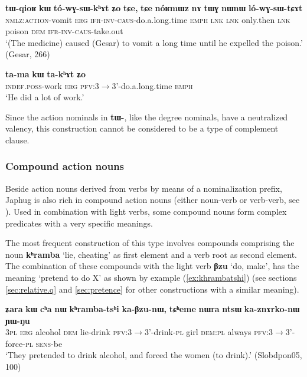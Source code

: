 \documentclass[oneside,a4paper,11pt]{article}
\newcommand{\ipa}[1]{\textbf{\phon#1}} %
\newcommand{\jpg}[2]{\ipa{#1} `#2'} %
\newcommand{\refb}[1]{(\ref{#1})}
\begin{document}
  \begin{exe}
\ex \label{ex:tWqioR}
\gll \ipa{tɯ-qioʁ}	\ipa{kɯ}	\ipa{tó-wɣ-sɯ-kʰɤt}	\ipa{ʑo}	\ipa{tɕe,}	\ipa{tɕe}	\ipa{nóʁmɯz}	\ipa{nɤ}	\ipa{tɯɣ}	\ipa{nɯnɯ}	\ipa{ló-wɣ-sɯ-tɕɤt} \\
\textsc{nmlz:action}-vomit \textsc{erg} \textsc{ifr-inv-caus}-do.a.long.time \textsc{emph} \textsc{lnk} \textsc{lnk} only.then \textsc{lnk} poison \textsc{dem} \textsc{ifr-inv-caus}-take.out \\
\glt `(The medicine) caused (Gesar) to vomit a long time until he expelled the poison.' (Gesar, 266)
\end{exe}

  \begin{exe}
\ex \label{ex:takhAt}
\gll 
\ipa{ta-ma}	\ipa{kɯ}	\ipa{ta-kʰɤt}	\ipa{ʑo} \\
\textsc{indef.poss}-work \textsc{erg} \textsc{pfv}:3$\rightarrow$3'-do.a.long.time \textsc{emph} \\
\glt  `He did a lot of work.'
\end{exe}

Since the action nominals in \ipa{tɯ-}, like the degree nominals, have a neutralized valency, this construction cannot be considered to be a type of complement clause.

\subsubsection{Compound action nouns} \label{sec:compound}
Beside action nouns derived from verbs by means of a nominalization prefix, Japhug is also rich in compound action nouns (either noun-verb or verb-verb, see \citealt{jacques12incorp}). Used in combination with light verbs, some compound nouns form complex predicates with a very specific meanings.

The most frequent construction of this type involves compounds comprising the noun \jpg{kʰramba}{lie, cheating} as first element and a verb root as second element. The combination of these compounds with the light verb \jpg{βzu}{do, make}, has the meaning `pretend to do X' as shown by example \refb{ex:khrambatshi} (see sections \ref{sec:relative.q} and \ref{sec:pretence} for other constructions with a similar meaning).

\begin{exe}
\ex \label{ex:khrambatshi}
 \gll 
\ipa{ʑara} 	\ipa{kɯ} 	\ipa{cʰa} 	\ipa{nɯ} 	\ipa{kʰramba-tsʰi} 	\ipa{ka-βzu-nɯ,} 	\ipa{tɕʰeme} 	\ipa{nɯra} 	\ipa{ntsɯ} 	\ipa{ka-znɤrko-nɯ} 	\ipa{ɲɯ-ŋu}  \\
\textsc{3pl} \textsc{erg} alcohol \textsc{dem} lie-drink \textsc{pfv}:3$\rightarrow$3'-drink-\textsc{pl} girl \textsc{dem:pl} always \textsc{pfv}:3$\rightarrow$3'-force-\textsc{pl}  \textsc{sens}-be \\
\glt  `They pretended to drink alcohol, and forced the women (to drink).' (Slobdpon05, 100)
\end{exe}
\end{document}
